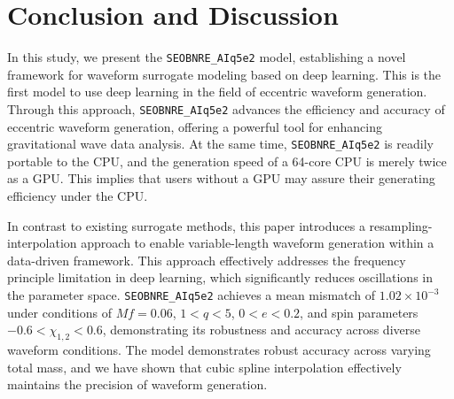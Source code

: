 \documentclass[
reprint,
superscriptaddress,
amsmath,amssymb,
aps,
prd,
floatfix,
]{revtex4-2}
\begin{document}
\section{Conclusion and Discussion}
\label{sec:con}
In this study, we present the \texttt{SEOBNRE\_AIq5e2} model, establishing a novel framework for waveform surrogate modeling based on deep learning. 
This is the first model to use deep learning in the field of eccentric waveform generation. 
Through this approach, \texttt{SEOBNRE\_AIq5e2} advances the efficiency and accuracy of eccentric waveform generation, offering a powerful tool for enhancing gravitational wave data analysis. 
At the same time, \texttt{SEOBNRE\_AIq5e2} is readily portable to the CPU, and the generation speed of a 64-core CPU is merely twice as a GPU. This implies that users without a GPU may assure their generating efficiency under the CPU.

In contrast to existing surrogate methods, this paper introduces a resampling-interpolation approach to enable variable-length waveform generation within a data-driven framework. 
This approach effectively addresses the frequency principle limitation \cite{xuFrequencyPrincipleFourier2020} in deep learning, which significantly reduces oscillations in the parameter space. 
\texttt{SEOBNRE\_AIq5e2} achieves a mean mismatch of $1.02 \times 10^{-3}$ under conditions of $Mf = 0.06$, $1 < q < 5$, $0 < e < 0.2$, and spin parameters $-0.6 < \chi_{1,2} < 0.6$, demonstrating its robustness and accuracy across diverse waveform conditions.
The model demonstrates robust accuracy across varying total mass, and we have shown that cubic spline interpolation effectively maintains the precision of waveform generation.
\end{document}
